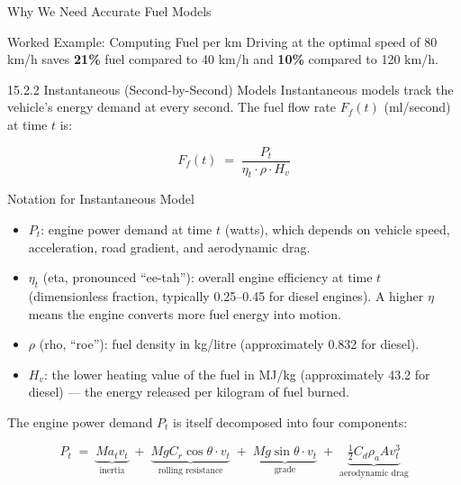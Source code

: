\documentclass[aspectratio=169,10pt]{beamer}
\begin{document}
\begin{frame}[allowframebreaks]{Why We Need Accurate Fuel Models}
\begin{exampleblock}{Worked Example: Computing Fuel per km}
    \medskip
    Driving at the optimal speed of 80 km/h saves \textbf{21\%} fuel compared
    to 40 km/h and \textbf{10\%} compared to 120 km/h.
  \end{exampleblock}

  \framebreak

  \begin{block}{15.2.2 Instantaneous (Second-by-Second) Models}
    Instantaneous models track the vehicle's energy demand at every second.
    The fuel flow rate $F_f(t)$ (ml/second) at time $t$ is:

    \[
      F_f(t) \;=\; \frac{P_t}{\eta_t \cdot \rho \cdot H_v}
    \]
  \end{block}

  \begin{block}{Notation for Instantaneous Model}
    \begin{itemize}
      \item $P_t$: engine power demand at time $t$ (watts), which depends on
      vehicle speed, acceleration, road gradient, and aerodynamic drag.
      \item $\eta_t$ (eta, pronounced ``ee-tah''): overall engine efficiency at
      time $t$ (dimensionless fraction, typically 0.25--0.45 for diesel engines).
      A higher $\eta$ means the engine converts more fuel energy into motion.
      \item $\rho$ (rho, ``roe''): fuel density in kg/litre (approximately 0.832
      for diesel).
      \item $H_v$: the lower heating value of the fuel in MJ/kg (approximately
      43.2 for diesel) --- the energy released per kilogram of fuel burned.
    \end{itemize}
  \end{block}

  \framebreak

  The engine power demand $P_t$ is itself decomposed into four components:

  \[
    P_t \;=\; \underbrace{M a_t v_t}_{\text{inertia}} \;+\;
             \underbrace{M g C_r \cos\theta \cdot v_t}_{\text{rolling resistance}} \;+\;
             \underbrace{M g \sin\theta \cdot v_t}_{\text{grade}} \;+\;
             \underbrace{\tfrac{1}{2} C_d \rho_a A v_t^3}_{\text{aerodynamic drag}}
  \]


\end{frame}
\end{document}
